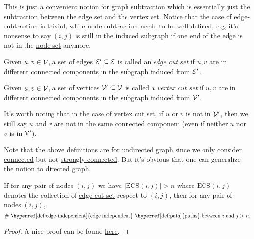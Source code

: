 \begin{intuition}
	This is just a convenient notion for \hyperref[def:graph]{graph} subtraction which is essentially just the subtraction between the edge set and the vertex set. Notice that the case of edge-subtraction is trivial, while node-subtraction needs to be well-defined, e.g, it's nonsense to say \((i, j)\) is still in the \hyperref[def:induced-subgraph]{induced subgraph} if one end of the edge is not in the \hyperref[def:vertex-set]{node set} anymore.
\end{intuition}

\begin{definition}\label{def:edge-cut-set}
	Given \(u, v\in \mathcal{\MakeUppercase{v}} \), a set of edges \(\mathcal{\MakeUppercase{e}} ^\prime \subseteq \mathcal{\MakeUppercase{e}} \) is called an \emph{edge cut set} if \(u, v\) are in different \hyperref[def:connected]{connected components} in the \hyperref[def:induced-subgraph]{subgraph induced from \(\mathcal{\MakeUppercase{e}} ^\prime \)}.
\end{definition}

\begin{definition}\label{def:vertex-cut-set}
	Given \(u, v\in \mathcal{\MakeUppercase{v}} \), a set of vertices \(\mathcal{\MakeUppercase{v}} ^\prime \subseteq \mathcal{\MakeUppercase{v}}\) is called a \emph{vertex cut set} if \(u, v\) are in different \hyperref[def:connected]{connected components} in the \hyperref[def:induced-subgraph]{subgraph induced from \(\mathcal{\MakeUppercase{v}} ^\prime \)}.
\end{definition}

\begin{note}
	It's worth noting that in the case of \hyperref[def:vertex-cut-set]{vertex cut set}, if \(u\) or \(v\) is not in \(\mathcal{\MakeUppercase{v}} ^\prime\), then we still say \(u\) and \(v\) are not in the same \hyperref[def:connected]{connected component} (even if neither \(u\) nor \(v\) is in \(\mathcal{\MakeUppercase{v}} ^\prime \)).
\end{note}

\begin{remark}
	Note that the above definitions are for \hyperref[def:undirected-graph]{undirected graph} since we only consider \hyperref[def:connected]{connected} but not \hyperref[def:strongly-connected]{strongly connected}. But it's obvious that one can generalize the notion to \hyperref[def:directed-graph]{directed graph}.
\end{remark}


\begin{theorem}\label{thm:Mengur-theorem}
	If for any pair of nodes \((i, j)\) we have \(\left\vert \mathrm{ECS}(i, j) \right\vert > n\) where \(\mathrm{ECS} (i, j)\) denotes the collection of \hyperref[def:edge-cut-set]{edge cut set} respect to \((i, j)\), then for any pair of nodes \((i, j)\),
	\[
		\# \text{ \hyperref[def:edge-independent]{edge independent} \hyperref[def:path]{paths} between } i \text{ and } j > n.
	\]
\end{theorem}
\begin{proof}
	A nice proof can be found \href{https://en.wikipedia.org/wiki/Menger%27s_theorem}{here}.
\end{proof}